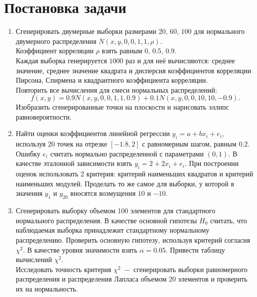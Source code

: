 \documentclass[a4paper]{article}
\begin{document}

\tableofcontents
{}
\newpage
\listoffigures
{}
\newpage
\listoftables
{}
\newpage
\section{Постановка задачи}
\begin{enumerate}
    \item Сгенерировать двумерные выборки размерами $20,\,60,\,100$ для нормального двумерного распределения $N(x,y,0,0,1,1,\rho)$.\\
    Коэффициент корреляции $\rho$ взять равным $0,\,0.5,\,0.9$.\\
    Каждая выборка генерируется $1000$ раз и для неё вычисляются: среднее значение, среднее значение квадрата и дисперсия коэффициентов корреляции Пирсона, Спирмена и квадрантного коэффициента корреляции.\\
    Повторить все вычисления для смеси нормальных распределений:
    \begin{equation*}
        f(x,y)=0.9N(x,y,0,0,1,1,0.9)+0.1N(x,y,0,0,10,10,-0.9).
    \end{equation*}
    Изобразить сгенерированные точки на плоскости и нарисовать эллипс
    равновероятности.
    \item Найти оценки коэффициентов линейной регрессии $y_i=a+b x_i + e_i$, используя 20 точек на отрезке $[-1.8,2]$ с равномерным шагом, равным $0.2$. Ошибку $e_i$ считать нормально распределенной с параметрами $(0,1)$. В качестве эталонной зависимости взять $y_i=2+2x_i+e_i$. При построении оценок использовать 2 критерия: критерий наименьших квадратов и критерий наименьших модулей. Проделать то же самое для выборки, у которой в значения $y_1$ и $y_{20}$ вносятся возмущения $10$ и $-10$.
    \item Сгенерировать выборку объемом 100 элементов для стандартного нормального распределения. В качестве основной гипотезы $H_0$ считать, что наблюдаемая выборка принадлежит стандартному нормальному распределению. Проверить основную гипотезу, используя критерий согласия $\chi^2$. В качестве уровня значимости взять $\alpha=0.05$. Привести таблицу вычислений $\chi^2$.\\
    Исследовать точность критерия $\chi^2\;-$ сгенерировать выборки равномерного распределения и распределения Лапласа объемом 20 элементов и проверить их на нормальность.
\end{enumerate}
\end{document}
